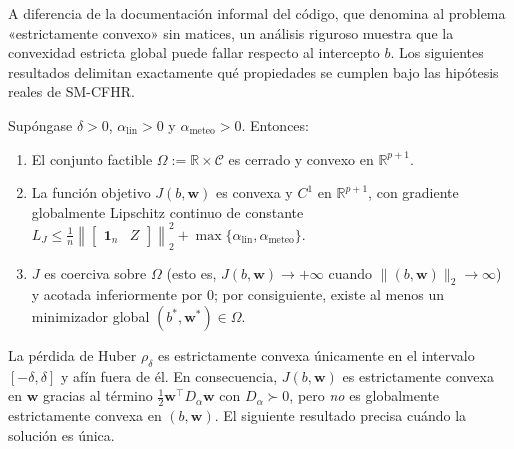 A diferencia de la documentación informal del código, que denomina al problema «estrictamente convexo» sin matices, un análisis riguroso muestra que la convexidad estricta global puede fallar respecto al intercepto $b$. Los siguientes resultados delimitan exactamente qué propiedades se cumplen bajo las hipótesis reales de SM-CFHR.

\begin{theorem}\label{thm:convexidad_existencia}
Supóngase $\delta > 0$, $\alpha_{\mathrm{lin}} > 0$ y $\alpha_{\mathrm{meteo}} > 0$. Entonces:
\begin{enumerate}
    \item El conjunto factible $\Omega := \mathbb{R} \times \mathcal{C}$ es cerrado y convexo en $\mathbb{R}^{p+1}$.
    \item La función objetivo $J(b,\mathbf{w})$ es convexa y $C^1$ en $\mathbb{R}^{p+1}$, con gradiente globalmente Lipschitz continuo de constante $L_J \le \frac{1}{n}\left\|\begin{bmatrix}\mathbf{1}_n & Z\end{bmatrix}\right\|_2^2 + \max\{\alpha_{\mathrm{lin}}, \alpha_{\mathrm{meteo}}\}$.
    \item $J$ es coerciva sobre $\Omega$ (esto es, $J(b,\mathbf{w}) \to +\infty$ cuando $\|(b,\mathbf{w})\|_2 \to \infty$) y acotada inferiormente por $0$; por consiguiente, existe al menos un minimizador global $(b^*, \mathbf{w}^*) \in \Omega$.
\end{enumerate}
\end{theorem}

La pérdida de Huber $\rho_\delta$ es estrictamente convexa únicamente en el intervalo $[-\delta, \delta]$ y afín fuera de él. En consecuencia, $J(b,\mathbf{w})$ es estrictamente convexa en $\mathbf{w}$ gracias al término $\frac{1}{2}\mathbf{w}^\top D_\alpha \mathbf{w}$ con $D_\alpha \succ 0$, pero \emph{no} es globalmente estrictamente convexa en $(b,\mathbf{w})$. El siguiente resultado precisa cuándo la solución es única.


